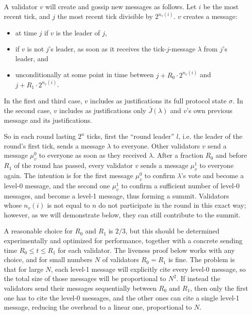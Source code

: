 \documentclass[12pt, fleqn]{article}
\begin{document}
A validator $v$ will create and gossip new messages as follows. Let $i$ be the most recent tick, and $j$ the most recent tick divisible by $2^{n_v(i)}$. $v$ creates a message:
\begin{itemize}
    \item at time $j$ if $v$ is the leader of $j$,
    \item if $v$ is not $j$'s leader, as soon as it receives the tick-$j$-message $\lambda$ from $j$'s leader, and
    \item unconditionally at some point in time between $j + R_0 \cdot 2^{n_v(i)}$ and $j + R_1 \cdot 2^{n_v(i)}$.
\end{itemize}
In the first and third case, $v$ includes as justifications its full protocol state $\sigma$. In the second case, $v$ includes as justifications only $\bar{J}(\lambda)$ and $v$'s own previous message and its justifications.

So in each round lasting $2^n$ ticks, first the ``round leader'' $l$, i.e. the leader of the round's first tick, sends a message $\lambda$ to everyone. Other validators $v$ send a message $\mu^0_v$ to everyone as soon as they received $\lambda$. After a fraction $R_0$ and before $R_1$ of the round has passed, every validator $v$ sends a message $\mu^1_v$ to everyone again. The intention is for the first message $\mu^0_v$ to confirm $\lambda$'s vote and become a level-0 message, and the second one $\mu^1_v$ to confirm a sufficient number of level-0 messages, and become a level-1 message, thus forming a summit. Validators whose $n_v(i)$ is not equal to $n$ do not participate in the round in this exact way; however, as we will demonstrate below, they can still contribute to the summit.

A reasonable choice for $R_0$ and $R_1$ is $2/3$, but this should be determined experimentally and optimized for performance, together with a concrete sending time $R_0 \leq t \leq R_1$ for each validator. The liveness proof below works with any choice, and for small numbers $N$ of validators $R_0 = R_1$ is fine. The problem is that for large $N$, each level-1 message will explicitly cite every level-0 message, so the total size of those messages will be proportional to $N^2$. If instead the validators send their messages sequentially between $R_0$ and $R_1$, then only the first one has to cite the level-0 messages, and the other ones can cite a single level-1 message, reducing the overhead to a linear one, proportional to $N$.
\end{document}
